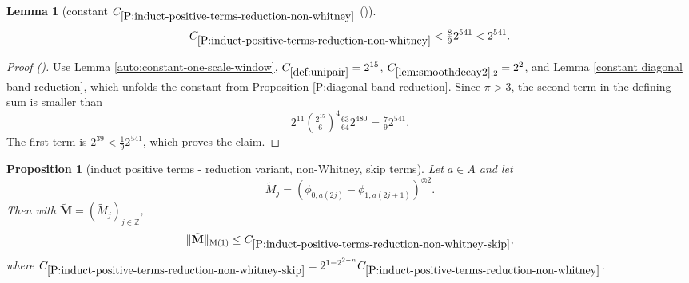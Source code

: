 \documentclass[12pt,reqno]{amsart}
\newcommand{\auto}{{({\tiny\faCar})}}
\theoremstyle{plain}
\newtheorem{lemma}[theorem]{Lemma}
\newtheorem{proposition}[theorem]{Proposition}
\numberwithin{equation}{section}
\theoremstyle{remark}
\newcommand{\uses}[1]{}
\newcommand{\usesdefs}[1]{}
\newcommand{\Z}{{\mathbb Z}}
\newcommand{\M}{\mathbf{M}}
\begin{document}
\begin{lemma}[constant $C_{\ref{P:induct-positive-terms-reduction-non-whitney}}$ \auto]\label{constant non Whitney reduction}\uses{auto:constant-one-scale-window,lem:smoothdecay2,P:diagonal-band-reduction,constant diagonal band reduction,P:induct-positive-terms-reduction-non-whitney}\usesdefs{def:unipair}
\begin{equation}\label{constant non Whitney reduction bound}
C_{\ref{P:induct-positive-terms-reduction-non-whitney}}
<\tfrac89 2^{541}<2^{541}.
\end{equation}
\end{lemma}
\begin{proof}[Proof \auto]
Use Lemma \ref{auto:constant-one-scale-window}, $C_{\ref{def:unipair}}=2^{15}$, $C_{\ref{lem:smoothdecay2},2}=2^2$, and Lemma \ref{constant diagonal band reduction}, which unfolds the constant from Proposition \ref{P:diagonal-band-reduction}. Since $\pi>3$, the second term in the defining sum is smaller than
\[
2^{11}\left(\tfrac{2^{15}}6\right)^4\tfrac{63}{64}2^{480}
=\tfrac79 2^{541}.
\]
The first term is $2^{39}<\frac19 2^{541}$, which proves the claim.
\end{proof}


\begin{proposition}[induct positive terms - reduction variant, non-Whitney, skip terms]
\label{P:induct-positive-terms-reduction-non-whitney-skip}\uses{positive terms,P:induct-positive-terms-reduction-non-whitney}\usesdefs{normalized function tuples,auto:prism-form-definition,multiplicatively spaced monotone sequences,geometric parameters,double sequence of 2D functions,kernel sequences,def:unipair}
Let $a\in A$ and let
\begin{equation}\label{auto:skipped-non-Whitney-kernel}\tilde{M}_j=({\phi}_{0,a(2j)}-{\phi}_{1,a(2j+1)})^{\otimes 2}.\end{equation}
Then with $\tilde{\M}=(\tilde{M}_j)_{j\in \Z}$,
\begin{equation}\label{E:est-skipped-terms}
\|\tilde{\M}\|_{\rm M(1)}\le C_{\ref{P:induct-positive-terms-reduction-non-whitney-skip}},
\end{equation}
where $C_{\ref{P:induct-positive-terms-reduction-non-whitney-skip}}= 2^{1-2^{2-n}} C_{\ref{P:induct-positive-terms-reduction-non-whitney}}$.
\end{proposition}
\end{document}
